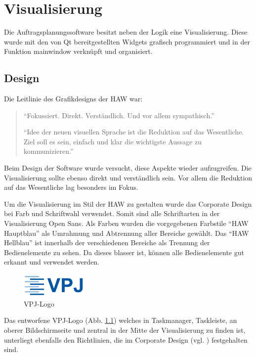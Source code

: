 
\chapter{Visualisierung}
\label{sec:Visualisierung}

Die Auftragsplanungssoftware besitzt neben der Logik eine Visualisierung. Diese wurde mit den von Qt bereitgestellten Widgets grafisch programmiert und in der Funktion mainwindow verknüpft und organisiert. 

\section{Design}

Die Leitlinie des Grafikdesigns der HAW war:

\begin{quote}
"`Fokussiert. Direkt. Verständlich.
Und vor allem sympathisch."'	

"`Idee der neuen visuellen Sprache ist die Reduktion auf das
Wesentliche. Ziel soll es sein, einfach und klar die wichtigste
Aussage zu kommunizieren."'
\cite[4]{corporate}
\end{quote}

Beim Design der Software wurde versucht, diese Aspekte wieder aufzugreifen. Die Visualisierung sollte ebenso direkt und verständlich sein. Vor allem die Reduktion auf das Wesentliche lag besonders im Fokus. 

Um die Visualisierung im Stil der HAW zu gestalten wurde das Corporate Design bei Farb und Schriftwahl verwendet. Somit sind alle Schriftarten in der Visualisierung Open Sans. Als Farben wurden die vorgegebenen Farbstile "`HAW Hauptblau"' als Umrahmung und Abtrennung aller Bereiche gewählt. Das "`HAW Hellblau"' ist innerhalb der verschiedenen Bereiche als Trennung der Bedienelemente zu sehen. Da dieses blasser ist, können alle Bedienelemente gut erkannt und verwendet werden. 

\begin{figure}[htb]
    \centering
    \includegraphics[width=0.3\textwidth]{Abbildungen/VPJ.png}
    \caption{VPJ-Logo}		
    \label{fig:VPJLogo}
\end{figure}

Das entworfene VPJ-Logo (Abb. \ref{fig:VPJLogo}) welches in Taskmanager, Taskleiste, an oberer Bildschirmseite und zentral in der Mitte der Visualisierung zu finden ist, unterliegt ebenfalls den Richtlinien, die im Corporate Design (vgl. \cite{corporate}) festgehalten sind. 

